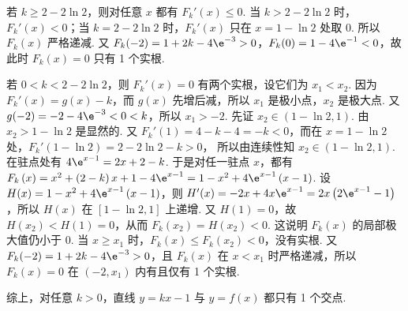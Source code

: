 \begin{solution}
\begin{enumerate}
若 \( k\ge 2-2\ln 2 \)，则对任意 \( x \) 都有 \( F_k'(x)\le 0 \). 当 \( k>2-2\ln 2 \) 时，\( F_k'(x)<0 \)；当 \( k=2-2\ln 2 \) 时，\( F_k'(x) \) 只在 \( x=1-\ln 2 \) 处取 0. 所以 \( F_k(x) \) 严格递减. 又 \( F_k(-2)=1+2k-4\e^{-3}>0 \)，\( F_k(0)=1-4\e^{-1}<0 \)，故此时 \( F_k(x)=0 \) 只有 1 个实根.

若 \( 0<k<2-2\ln 2 \)，则 \( F_k'(x)=0 \) 有两个实根，设它们为 \( x_1<x_2 \). 因为 \( F_k'(x)=g(x)-k \)，而 \( g(x) \) 先增后减，所以 \( x_1 \) 是极小点，\( x_2 \) 是极大点. 又 \( g(-2)=-2-4\e^{-3}<0<k \)，所以 \( x_1>-2 \).
先证 \( x_2\in \left( 1-\ln 2,1 \right) \). 由 \( x_2>1-\ln 2 \) 是显然的. 又 \( F_k'(1)=4-k-4=-k<0 \)，而在 \( x=1-\ln 2 \) 处，\( F_k'\left( 1-\ln 2 \right)=2-2\ln 2-k>0 \)，
所以由连续性知 \( x_2\in \left( 1-\ln 2,1 \right) \).
在驻点处有 \( 4\e^{x-1}=2x+2-k \). 于是对任一驻点 \( x \)，都有 \( F_k\left( x \right)=x^2+\left( 2-k \right)x+1-4\e^{x-1}=1-x^2+4\e^{x-1}\left( x-1 \right) \).
设 \( H(x)=1-x^2+4\e^{x-1}\left( x-1 \right) \)，则 \( H'(x)=-2x+4x\e^{x-1}=2x\left( 2\e^{x-1}-1 \right) \)，所以 \( H(x) \) 在 \( \left[ 1-\ln 2,1 \right] \) 上递增. 又 \( H(1)=0 \)，故 \( H\left( x_2 \right)<H(1)=0 \)，从而 \( F_k\left( x_2 \right)=H\left( x_2 \right)<0 \).
这说明 \( F_k(x) \) 的局部极大值仍小于 0. 当 \( x\ge x_1 \) 时，\( F_k(x) \le F_k\left( x_2 \right)<0 \)，没有实根. 又 \( F_k(-2)=1+2k-4\e^{-3}>0 \)，且 \( F_k(x) \) 在 \( x<x_1 \) 时严格递减，所以 \( F_k(x)=0 \) 在 \( \left( -2,x_1 \right) \) 内有且仅有 1 个实根.

综上，对任意 \( k>0 \)，直线 \( y=kx-1 \) 与 \( y=f(x) \) 都只有 1 个交点.
\end{enumerate}
\end{solution}

